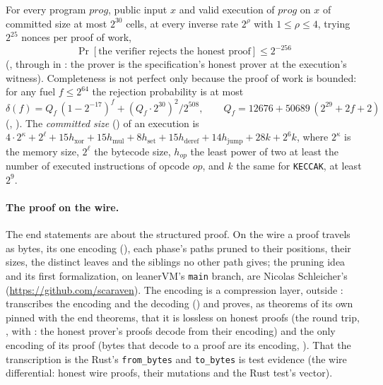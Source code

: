 \documentclass[11pt]{article}
\begin{document}
For every program $\mathit{prog}$, public input $x$ and valid execution of $\mathit{prog}$ on $x$ of committed size at
most $2^{30}$ cells, at every inverse rate $2^\rho$ with $1 \le \rho \le 4$, trying $2^{25}$ nonces
per proof of work,
\[
\boxed{\ \Pr[\text{the verifier rejects the honest proof}] \le 2^{-256}\ }
\]
(, through  in : the prover is the
specification's honest prover at the execution's witness). Completeness is not perfect only
because the proof of work is bounded: for any fuel $f \le 2^{64}$ the rejection probability is at
most
\[
\delta(f) = Q_f\,(1-2^{-17})^{f} + (Q_f\cdot 2^{30})^2/2^{508}, \qquad
Q_f = 12676 + 50689\,(2^{29} + 2f + 2)
\]
(, ). The \emph{committed size} () of an
execution is
$4\cdot 2^{\kappa} + 2^{\ell} + 15h_{\mathrm{xor}} + 15h_{\mathrm{mul}} + 8h_{\mathrm{set}} +
15h_{\mathrm{deref}} + 14h_{\mathrm{jump}} + 28k + 2^6 k$, where $2^\kappa$ is the memory size,
$2^\ell$ the bytecode size, $h_{op}$ the least power of two at least the number of executed
instructions of opcode $op$, and $k$ the same for \texttt{KECCAK}, at least $2^9$.

\paragraph{The proof on the wire.} The end statements are about the structured proof. On the wire
a proof travels as bytes, its one encoding (), each phase's
paths pruned to their positions, their sizes, the distinct leaves and the siblings no other path
gives; the pruning idea and its first formalization, on leanerVM's \texttt{main} branch, are
Nicolas Schleicher's (\url{https://github.com/scaraven}). The encoding is a compression layer, outside
:  transcribes the encoding and the decoding
() and proves, as theorems of its own pinned with the end
theorems, that it is lossless on honest proofs (the round trip, , with
: the honest prover's proofs decode from their
encoding) and the only encoding of its proof (bytes that decode to a proof are its encoding,
). That the transcription is the Rust's
\texttt{from\_bytes} and \texttt{to\_bytes} is test evidence (the wire differential: honest wire
proofs, their mutations and the Rust test's vector).
\end{document}
